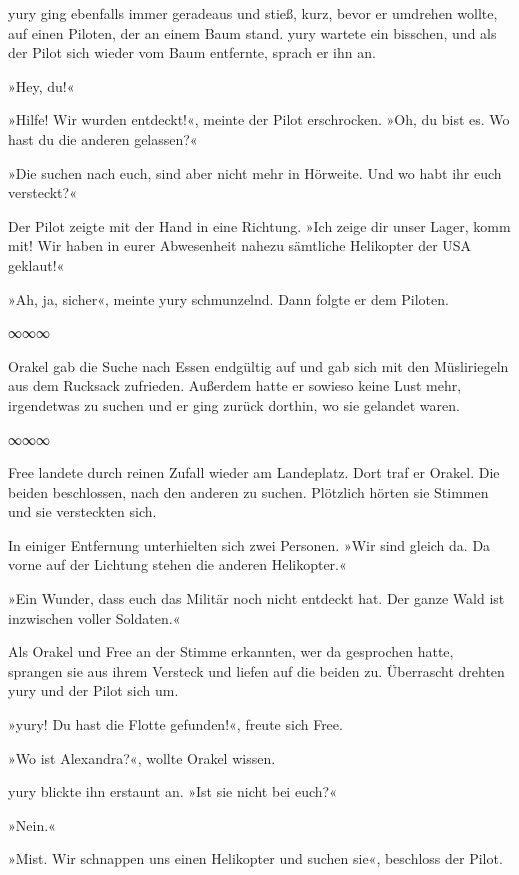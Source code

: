 yury ging ebenfalls immer geradeaus und stieß, kurz, bevor er umdrehen wollte, auf einen Piloten, der an einem Baum stand. yury wartete ein bisschen, und als der Pilot sich wieder vom Baum entfernte, sprach er ihn an.

»Hey, du!«

»Hilfe! Wir wurden entdeckt!«, meinte der Pilot erschrocken. »Oh, du bist es. Wo hast du die anderen gelassen?«

»Die suchen nach euch, sind aber nicht mehr in Hörweite. Und wo habt ihr euch versteckt?«

Der Pilot zeigte mit der Hand in eine Richtung. »Ich zeige dir unser Lager, komm mit! Wir haben in eurer Abwesenheit nahezu sämtliche Helikopter der USA geklaut!«

»Ah, ja, sicher«, meinte yury schmunzelnd. Dann folgte er dem Piloten.

\begin{center}
    ∞∞∞
\end{center}

Orakel gab die Suche nach Essen endgültig auf und gab sich mit den Müsliriegeln aus dem Rucksack zufrieden. Außerdem hatte er sowieso keine Lust mehr, irgendetwas zu suchen und er ging zurück dorthin, wo sie gelandet waren.

\begin{center}
    ∞∞∞
\end{center}

Free landete durch reinen Zufall wieder am Landeplatz. Dort traf er Orakel. Die beiden beschlossen, nach den anderen zu suchen. Plötzlich hörten sie Stimmen und sie versteckten sich.

In einiger Entfernung unterhielten sich zwei Personen. »Wir sind gleich da. Da vorne auf der Lichtung stehen die anderen Helikopter.«

»Ein Wunder, dass euch das Militär noch nicht entdeckt hat. Der ganze Wald ist inzwischen voller Soldaten.«

Als Orakel und Free an der Stimme erkannten, wer da gesprochen hatte, sprangen sie aus ihrem Versteck und liefen auf die beiden zu. Überrascht drehten yury und der Pilot sich um.

»yury! Du hast die Flotte gefunden!«, freute sich Free.

»Wo ist Alexandra?«, wollte Orakel wissen.

yury blickte ihn erstaunt an. »Ist sie nicht bei euch?«

»Nein.«

»Mist. Wir schnappen uns einen Helikopter und suchen sie«, beschloss der Pilot.

